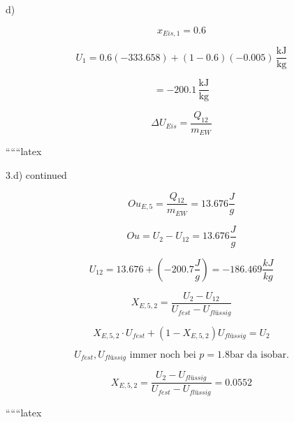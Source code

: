 d)

\[
x_{Eis,1} = 0.6
\]

\[
U_1 = 0.6 (-333.658) + (1 - 0.6) (-0.005) \, \frac{\text{kJ}}{\text{kg}}
\]

\[
= -200.1 \, \frac{\text{kJ}}{\text{kg}}
\]

\[
\Delta U_{Eis} = \frac{Q_{12}}{m_{EW}}
\]

``````latex


3.d) continued

\[
Ou_{E,5} = \frac{Q_{12}}{m_{EW}} = \boxed{13.676 \frac{J}{g}}
\]

\[
Ou = U_2 - U_{12} = 13.676 \frac{J}{g}
\]

\[
U_{12} = 13.676 + (-200.7 \frac{J}{g}) = \boxed{-186.469 \frac{kJ}{kg}}
\]

\[
X_{E,5,2} = \frac{U_2 - U_{12}}{U_{fest} - U_{flüssig}}
\]

\[
X_{E,5,2} \cdot U_{fest} + (1 - X_{E,5,2}) U_{flüssig} = U_2
\]

\[
U_{fest}, U_{flüssig} \text{ immer noch bei } p = 1.8 \text{bar} \text{ da isobar.}
\]

\[
X_{E,5,2} = \frac{U_2 - U_{flüssig}}{U_{fest} - U_{flüssig}} = \boxed{0.0552}
\]

``````latex
